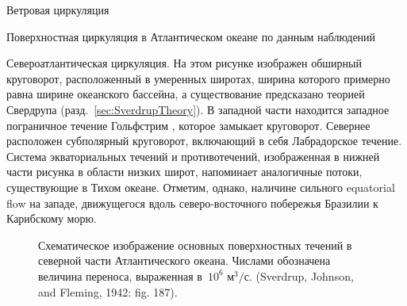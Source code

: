 \begin{chapter}{Ветровая циркуляция}
\begin{section}{Поверхностная циркуляция в Атлантическом океане по данным наблюдений}
\begin{paragraph}{Североатлантическая циркуляция.}
На этом рисунке изображен обширный круговорот, расположенный в умеренных 
широтах, ширина которого примерно равна ширине океанского бассейна,
а существование предсказано теорией Свердрупа 
(разд.~\ref{sec:SverdrupTheory}). В западной части находится западное
пограничное течение Гольфстрим%
, которое замыкает
круговорот. Севернее расположен субполярный круговорот, включающий в себя
Лабрадорское течение. Система экваториальных течений и противотечений,
изображенная в нижней части рисунка в области низких широт, напоминает
аналогичные потоки, существующие в Тихом океане. Отметим, однако, наличине
сильного equatorial flow на западе, движущегося вдоль северо-восточного 
побережья Бразилии к Карибскому морю.
%

\begin{figure}[t!]
\caption{Схематическое изображение основных поверхностных течений в северной
части Атлантического океана. Числами обозначена величина 
переноса, выраженная 
в~$10^6\text{~м}^3/\text{с}$. (Sverdrup, Johnson, and Fleming, 1942: fig. 187).}
\label{fig:NAtlcur1}
\end{figure}
%
%


\end{paragraph}
\end{section}
\end{chapter}
